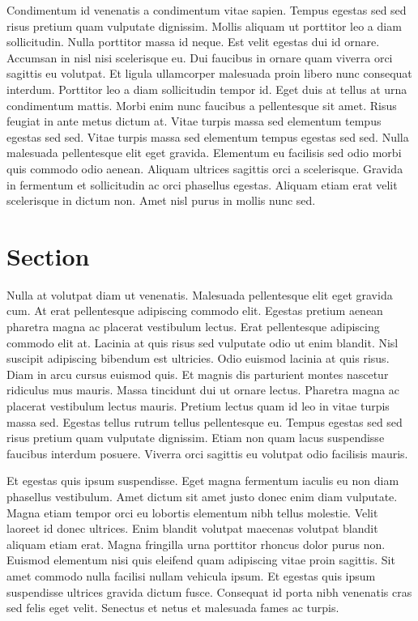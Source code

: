 \documentclass[paper = a4, fontsize = 12pt, numbers = noenddot, DIV = 15, twoside, 
paper = portrait,
listof = totoc,
listof = chapterentry,
egregdoesnotlikesansseriftitles, %
parskip = half %
]{scrbook}
\begin{document}
Condimentum id venenatis a condimentum vitae sapien. Tempus egestas sed sed risus pretium quam vulputate dignissim. Mollis aliquam ut porttitor leo a diam sollicitudin. Nulla porttitor massa id neque. Est velit egestas dui id ornare. Accumsan in nisl nisi scelerisque eu. Dui faucibus in ornare quam viverra orci sagittis eu volutpat. Et ligula ullamcorper malesuada proin libero nunc consequat interdum. Porttitor leo a diam sollicitudin tempor id. Eget duis at tellus at urna condimentum mattis. Morbi enim nunc faucibus a pellentesque sit amet. Risus feugiat in ante metus dictum at. Vitae turpis massa sed elementum tempus egestas sed sed. Vitae turpis massa sed elementum tempus egestas sed sed. Nulla malesuada pellentesque elit eget gravida. Elementum eu facilisis sed odio morbi quis commodo odio aenean. Aliquam ultrices sagittis orci a scelerisque. Gravida in fermentum et sollicitudin ac orci phasellus egestas. Aliquam etiam erat velit scelerisque in dictum non. Amet nisl purus in mollis nunc sed.

\section{Section}

Nulla at volutpat diam ut venenatis. Malesuada pellentesque elit eget gravida cum. At erat pellentesque adipiscing commodo elit. Egestas pretium aenean pharetra magna ac placerat vestibulum lectus. Erat pellentesque adipiscing commodo elit at. Lacinia at quis risus sed vulputate odio ut enim blandit. Nisl suscipit adipiscing bibendum est ultricies. Odio euismod lacinia at quis risus. Diam in arcu cursus euismod quis. Et magnis dis parturient montes nascetur ridiculus mus mauris. Massa tincidunt dui ut ornare lectus. Pharetra magna ac placerat vestibulum lectus mauris. Pretium lectus quam id leo in vitae turpis massa sed. Egestas tellus rutrum tellus pellentesque eu. Tempus egestas sed sed risus pretium quam vulputate dignissim. Etiam non quam lacus suspendisse faucibus interdum posuere. Viverra orci sagittis eu volutpat odio facilisis mauris.

Et egestas quis ipsum suspendisse. Eget magna fermentum iaculis eu non diam phasellus vestibulum. Amet dictum sit amet justo donec enim diam vulputate. Magna etiam tempor orci eu lobortis elementum nibh tellus molestie. Velit laoreet id donec ultrices. Enim blandit volutpat maecenas volutpat blandit aliquam etiam erat. Magna fringilla urna porttitor rhoncus dolor purus non. Euismod elementum nisi quis eleifend quam adipiscing vitae proin sagittis. Sit amet commodo nulla facilisi nullam vehicula ipsum. Et egestas quis ipsum suspendisse ultrices gravida dictum fusce. Consequat id porta nibh venenatis cras sed felis eget velit. Senectus et netus et malesuada fames ac turpis.
\end{document}
